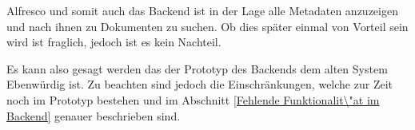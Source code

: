 Alfresco und somit auch das Backend ist in der Lage alle Metadaten anzuzeigen und nach ihnen zu Dokumenten zu suchen. Ob dies sp\"ater einmal von Vorteil sein wird ist fraglich, jedoch ist es kein Nachteil.

Es kann also gesagt werden das der Prototyp des Backends dem alten System Ebenw\"urdig ist. Zu beachten sind jedoch die Einschr\"ankungen, welche zur Zeit noch im Prototyp bestehen und im Abschnitt \ref{Fehlende Funktionalit\"at im Backend} genauer beschrieben sind.
